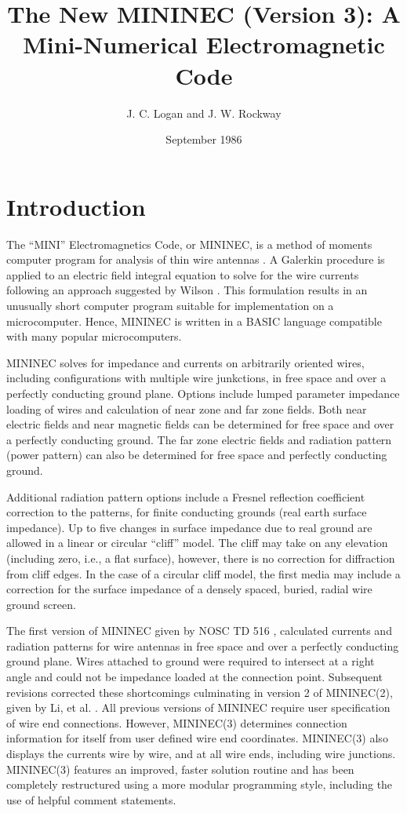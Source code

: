 \documentclass[12pt]{article}
\title{The New MININEC (Version 3): A Mini-Numerical Electromagnetic Code}
\author{J. C. Logan and J. W. Rockway}
\affil{Naval Ocean Systems Center San Diego}
\date{September 1986}
\begin{document}
\maketitle


\newcommand{\dd}[1]{\mathrm{d}#1}
\newcommand{\vect}[1]{\bar{#1}}
\newcommand{\Einc}{\vect{E}_{\mathrm{inc}}}

\section{Introduction}
The ``MINI'' Electromagnetics Code, or MININEC, is a method of moments
computer program for analysis of thin wire antennas \cite{r1}. A
Galerkin procedure is applied to an electric field integral equation to
solve for the wire currents following an approach suggested by Wilson
\cite{r2}. This formulation results in an unusually short computer
program suitable for implementation on a microcomputer. Hence, MININEC
is written in a BASIC language compatible with many popular
microcomputers.

MININEC solves for impedance and currents on arbitrarily oriented wires,
including configurations with multiple wire junkctions, in free space
and over a perfectly conducting ground plane. Options include lumped
parameter impedance loading of wires and calculation of near zone and
far zone fields. Both near electric fields and near magnetic fields can
be determined for free space and over a perfectly conducting ground. The
far zone electric fields and radiation pattern (power pattern) can also
be determined for free space and perfectly conducting ground.

Additional radiation pattern options include a Fresnel reflection
coefficient correction to the patterns, for finite conducting grounds
(real earth surface impedance). Up to five changes in surface impedance
due to real ground are allowed in a linear or circular ``cliff'' model.
The cliff may take on any elevation (including zero, i.e., a flat
surface), however, there is no correction for diffraction from cliff
edges. In the case of a circular cliff model, the first media may
include a correction for the surface impedance of a densely spaced,
buried, radial wire ground screen.

The first version of MININEC given by NOSC TD 516 \cite{r1}, calculated
currents and radiation patterns for wire antennas in free space and over
a perfectly conducting ground plane. Wires attached to ground were
required to intersect at a right angle and could not be impedance loaded
at the connection point. Subsequent revisions corrected these
shortcomings culminating in version 2 of MININEC(2), given by Li, et al.
\cite{r3}. All previous versions of MININEC require user specification
of wire end connections. However, MININEC(3) determines connection
information for itself from user defined wire end coordinates.
MININEC(3) also displays the currents wire by wire, and at all wire
ends, including wire junctions. MININEC(3) features an improved, faster
solution routine and has been completely restructured using a more
modular programming style, including the use of helpful comment
statements.
\end{document}
